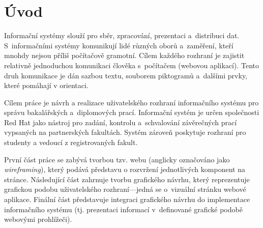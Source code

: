 \chapter{Úvod}

Informační systémy slouží pro sběr, zpracování, prezentaci a~distribuci dat. S~informačními systémy komunikují lidé různých oborů a~zaměření, kteří mnohdy nejsou příliš počítačově gramotní. Cílem každého rozhraní je zajistit relativně jednoduchou komunikaci člověka s~počítačem (webovou aplikací). Tento druh komunikace je dán sazbou textu, souborem piktogramů a~dalšími prvky, které pomáhají v orientaci.

Cílem práce je návrh a realizace uživatelského rozhraní informačního systému pro správu bakalářských a~diplomových prací. Informační systém je určen společnosti Red Hat jako nástroj pro zadání, kontrolu a~schvalování závěrečných prací vypsaných na partnerských fakultách. Systém zároveň poskytuje rozhraní pro studenty a vedoucí z registrovaných fakult.

První část práce se zabývá tvorbou tzv.  webu (anglicky označováno jako \textit{wireframing}), který podává představu o rozvržení jednotlivých komponent na stránce. Následující část zahrnuje tvorbu grafického návrhu, který reprezentuje grafickou podobu uživatelského rozhraní---jedná se o~vizuální stránku webové aplikace. Finální část představuje integraci grafického návrhu do implementace informačního systému (tj. prezentaci informací v~definované grafické podobě webovými prohlížeči).
